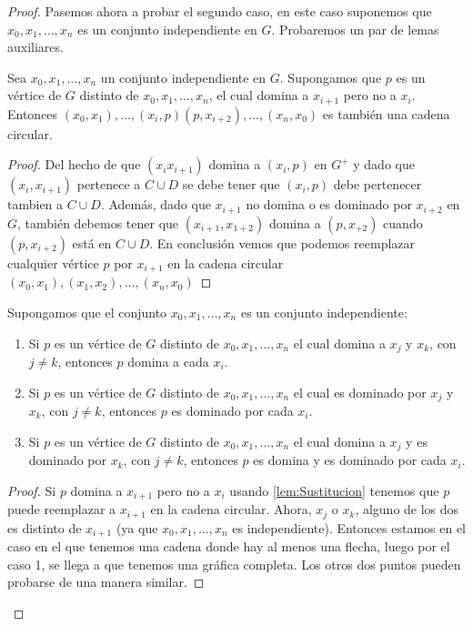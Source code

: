 \begin{proof}
Pasemos ahora a probar el segundo caso, en este caso suponemos que
$x_0,x_1,\dots,x_n$ es un conjunto independiente en $G$. Probaremos un par de
lemas auxiliares. 

\begin{lema}
  \label{lem:Sustitucion}
  Sea $x_0,x_1,\dots,x_n $ un conjunto independiente en $G$. Supongamos que $p$
  es un v\'ertice de $G$ distinto de $x_0,x_1,\dots,x_n$, el cual domina a
  $x_{i+1}$ pero no a $x_i$. Entonces $(x_0,x_1),\dots,
  (x_i,p)(p,x_{i+2}),\dots, (x_n,x_0)$ es tambi\'en una cadena circular.
\end{lema}
\begin{proof}
  Del hecho de que $(x_ix_{i+1})$ domina a $(x_i,p)$ en $G^+$ y dado que
  $(x_i,x_{i+1})$ pertenece a $C\cup D$ se debe tener que $(x_i,p)$ debe
  pertenecer tambien a $C\cup D$. Adem\'as, dado que $x_{i+1}$ no domina o es
  dominado por $x_{i+2}$ en $G$, tambi\'en debemos tener que $(x_{i+1},x_{1+2})$
  domina a $(p,x_{+2})$ cuando $(p,x_{i+2})$ est\'a en $C\cup D$. En
  conclusi\'on vemos que podemos reemplazar cualquier v\'ertice $p$ por
  $x_{i+1}$ en la cadena circular $(x_0,x_1),(x_1,x_2),\dots , (x_n,x_0)$
\end{proof}

\begin{lema}
  \label{lem:Completa}
  Supongamos que el conjunto $x_0,x_1,\dots,x_n$ es un conjunto independiente:
  \begin{enumerate}
    \item Si $p$ es un v\'ertice de $G$ distinto de $x_0,x_1,\dots,x_n$ el cual
    domina a $x_j$ y $x_k$, con $j\neq k$, entonces $p$ domina a cada $x_i$.

    \item Si $p$ es un v\'ertice de $G$ distinto de $x_0,x_1,\dots,x_n$ el cual
    es dominado por $x_j$ y $x_k$, con $j\neq k$, entonces $p$ es dominado por
    cada $x_i$.

    \item Si $p$ es un v\'ertice de $G$ distinto de $x_0,x_1,\dots,x_n$ el cual
    domina a $x_j$ y es dominado por $x_k$, con $j\neq k$, entonces $p$ es
    domina y es dominado por cada $x_i$.
  \end{enumerate}

\end{lema}

\begin{proof} 
  Si $p $ domina a $x_{i+1}$ pero no a $x_i$ usando \cref{lem:Sustitucion}
  tenemos que $p$ puede reemplazar a $x_{i+1}$ en la cadena circular. Ahora,
  $x_j$ o $x_k$, alguno de los dos es distinto de $x_{i+1}$ (ya que
  $x_0,x_1,\dots,x_n$ es independiente). Entonces estamos en el caso en el que
  tenemos una cadena donde hay al menos una flecha, luego por el caso 1, se
  llega a que tenemos una gr\'afica completa. Los otros dos puntos pueden
  probarse de una manera similar.
\end{proof}  


\end{proof}
